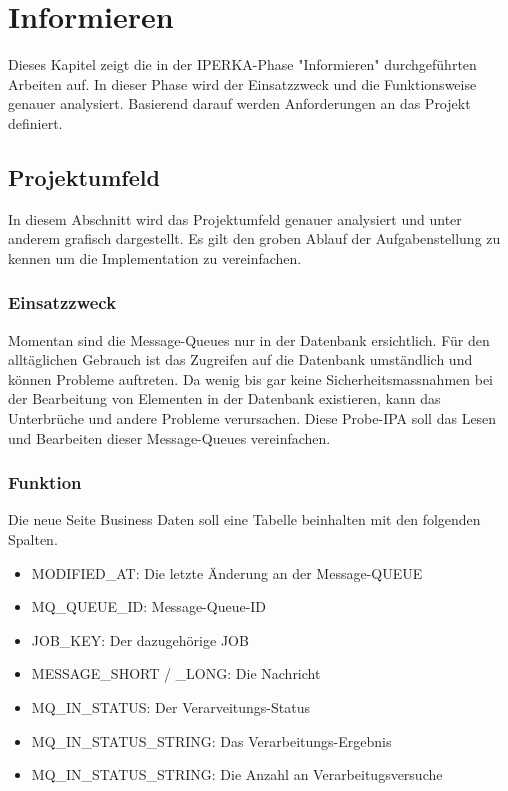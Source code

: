 \chapter{Informieren}\label{ch:informieren}
Dieses Kapitel zeigt die in der IPERKA-Phase "Informieren" durchgeführten Arbeiten auf. In dieser Phase wird der Einsatzzweck und die Funktionsweise genauer analysiert. Basierend darauf werden Anforderungen an das Projekt definiert.

\section{Projektumfeld}
In diesem Abschnitt wird das Projektumfeld genauer analysiert und unter anderem grafisch dargestellt. Es gilt den groben Ablauf der Aufgabenstellung zu kennen um die Implementation zu vereinfachen.

\subsection{Einsatzzweck}
Momentan sind die Message-Queues nur in der Datenbank ersichtlich. Für den alltäglichen Gebrauch ist das Zugreifen auf die Datenbank umständlich und können Probleme auftreten. Da wenig bis gar keine Sicherheitsmassnahmen bei der Bearbeitung von Elementen in der Datenbank existieren, kann das Unterbrüche und andere Probleme verursachen. Diese Probe-IPA soll das Lesen und Bearbeiten dieser Message-Queues vereinfachen.

\subsection{Funktion}
Die neue Seite Business Daten soll eine Tabelle beinhalten mit den folgenden Spalten.
\begin{itemize}
	\item MODIFIED\_AT: Die letzte Änderung an der Message-QUEUE
	\item MQ\_QUEUE\_ID: Message-Queue-ID
	\item JOB\_KEY: Der dazugehörige JOB
	\item MESSAGE\_SHORT / \_LONG: Die Nachricht
	\item MQ\_IN\_STATUS: Der Verarveitungs-Status
	\item MQ\_IN\_STATUS\_STRING: Das Verarbeitungs-Ergebnis
	\item MQ\_IN\_STATUS\_STRING: Die Anzahl an Verarbeitugsversuche
\end{itemize}

